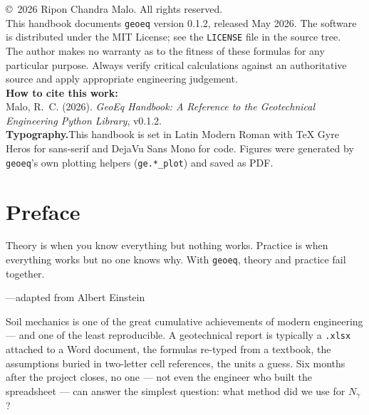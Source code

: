 \documentclass[11pt,a4paper,openany]{book}
\newcommand{\geo}{\texttt{geoeq}}
\begin{document}
\thispagestyle{empty}
\vspace*{\fill}
\noindent
\copyright\ 2026 Ripon Chandra Malo. All rights reserved.\\[6pt]
This handbook documents \texttt{geoeq} version 0.1.2, released
May 2026. The software is distributed under the MIT License; see
the \texttt{LICENSE} file in the source tree.\\[6pt]
The author makes no warranty as to the fitness of these formulas
for any particular purpose. Always verify critical calculations
against an authoritative source and apply appropriate engineering
judgement.\\[1.4cm]
\textbf{How to cite this work:}\\[4pt]
Malo, R.~C. (2026). \emph{GeoEq Handbook: A Reference to the
Geotechnical Engineering Python Library}, v0.1.2.
\\[1cm]
\textbf{Typography.}\quad This handbook is set in Latin Modern
Roman with TeX Gyre Heros for sans-serif and DejaVu Sans Mono for
code. Figures were generated by \texttt{geoeq}'s own plotting
helpers (\texttt{ge.*\_plot}) and saved as PDF.
\newpage

\frontmatter
\tableofcontents
\listoffigures
\listoftables
\newpage

\chapter*{Preface}

\epigraph{Theory is when you know everything but nothing works.
Practice is when everything works but no one knows why.
With \geo{}, theory and practice fail together.}{---adapted from
Albert Einstein}

\noindent
Soil mechanics is one of the great cumulative achievements of
modern engineering --- and one of the least reproducible.
A geotechnical report is typically a \texttt{.xlsx}
attached to a Word document, the formulas re-typed from a textbook,
the assumptions buried in two-letter cell references, the units a
guess. Six months after the project closes, no one --- not even
the engineer who built the spreadsheet --- can answer the simplest
question: what method did we use for $N_\gamma$?
\end{document}
